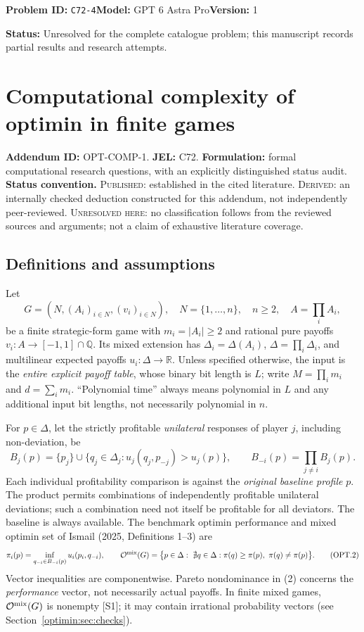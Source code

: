 \documentclass[11pt,a4paper]{article}
\providecommand{\D}{\Delta}
\providecommand{\Opt}{\mathcal O}
\providecommand{\Q}{\mathbb Q}
\providecommand{\RR}{\mathbb R}
\begin{document}
\noindent\textbf{Problem ID:} \texttt{C72-4}\quad\textbf{Model:} GPT 6 Astra Pro\quad\textbf{Version:} 1\par
\noindent\textbf{Status:} Unresolved for the complete catalogue problem; this manuscript records partial results and research attempts.\par
\section{Computational complexity of optimin in finite games}
\label{problem:OP-0589}
\noindent\textbf{Addendum ID:} OPT-COMP-1. \textbf{JEL:} C72. \textbf{Formulation:} formal computational research questions, with an explicitly distinguished status audit.
\noindent\textbf{Status convention.} \textsc{Published}: established in the cited literature. \textsc{Derived}: an internally checked deduction constructed for this addendum, not independently peer-reviewed. \textsc{Unresolved here}: no classification follows from the reviewed sources and arguments; not a claim of exhaustive literature coverage.
\subsection*{Definitions and assumptions}\label{optimin:sec:def}
Let
\[
 G=(N,(A_i)_{i\in N},(v_i)_{i\in N}),\quad
 N=\{1,\ldots,n\},\quad n\ge2,\quad A=\prod_i A_i,
\]
be a finite strategic-form game with $m_i=|A_i|\ge2$ and rational pure payoffs
$v_i:A\to[-1,1]\cap\Q$. Its mixed extension has $\D_i=\D(A_i)$,
$\D=\prod_i\D_i$, and multilinear expected payoffs $u_i:\D\to\RR$.
Unless specified otherwise, the input is the \emph{entire explicit payoff table},
whose binary bit length is $L$; write $M=\prod_i m_i$ and $d=\sum_i m_i$.
``Polynomial time'' always means polynomial in $L$ and any additional input bit lengths, not necessarily polynomial in $n$.

For $p\in\D$, let the strictly profitable \emph{unilateral} responses of player $j$, including non-deviation, be
\[
 B_j(p)=\{p_j\}\cup
 \bigl\{q_j\in\D_j:u_j(q_j,p_{-j})>u_j(p)\bigr\},
 \qquad B_{-i}(p)=\prod_{j\ne i}B_j(p).
\tag{OPT.1}\label{optimin:eq:B}
\]
Each individual profitability comparison is against the \emph{original baseline profile} $p$. The product permits combinations of independently profitable unilateral deviations; such a combination need not itself be profitable for all deviators. The baseline is always available. The benchmark optimin performance and mixed optimin set of Ismail (2025, Definitions 1--3) are
\[
 \pi_i(p)=\inf_{q_{-i}\in B_{-i}(p)}u_i(p_i,q_{-i}),\qquad
 \Opt^{\rm mix}(G)=\bigl\{p\in\D:\ \nexists q\in\D:
  \pi(q)\ge\pi(p),\ \pi(q)\ne\pi(p)\bigr\}.
\tag{OPT.2}\label{optimin:eq:pi}
\]
Vector inequalities are componentwise. Pareto nondominance in (2) concerns the \emph{performance} vector, not necessarily actual payoffs. In finite mixed games, $\Opt^{\rm mix}(G)$ is nonempty [S1]; it may contain irrational probability vectors (see Section~\ref{optimin:sec:checks}).
\end{document}
